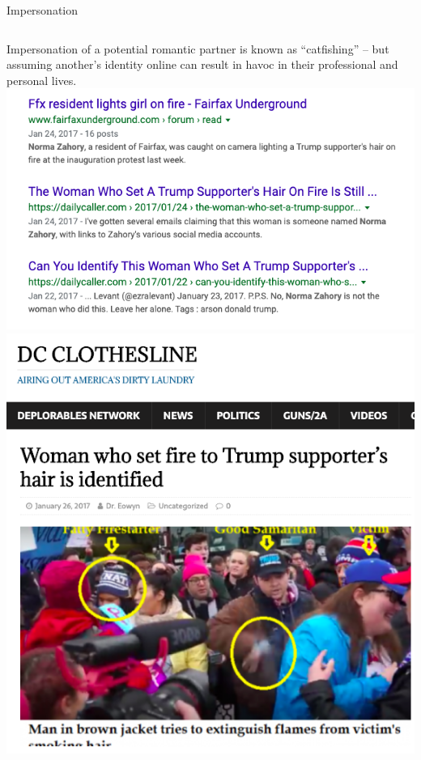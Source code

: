 \documentclass[nobackground,dvipsnames,table,aspectratio=169]{beamer}
\begin{document}
\begin{frame}{Impersonation}
    \begin{columns}
            \centering
            \small
            Impersonation of a potential romantic partner is known as “catfishing” -- but assuming another’s identity online can result in havoc in their professional and personal lives.
            \includegraphics[width=\textwidth]{hair-on-fire-search}
            \includegraphics[width=\textwidth]{hair-on-fire-article}
    \end{columns}
\end{frame}
\end{document}
